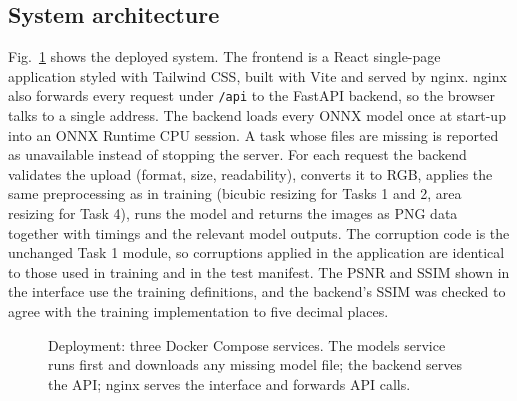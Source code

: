 \documentclass[conference]{IEEEtran}
\begin{document}
\subsection{System architecture}
Fig.~\ref{fig:sysarch} shows the deployed system. The frontend is a React single-page application styled with Tailwind CSS, built with Vite and served by nginx. nginx also forwards every request under \texttt{/api} to the FastAPI backend, so the browser talks to a single address. The backend loads every ONNX model once at start-up into an ONNX Runtime CPU session. A task whose files are missing is reported as unavailable instead of stopping the server. For each request the backend validates the upload (format, size, readability), converts it to RGB, applies the same preprocessing as in training (bicubic resizing for Tasks 1 and 2, area resizing for Task 4), runs the model and returns the images as PNG data together with timings and the relevant model outputs. The corruption code is the unchanged Task 1 module, so corruptions applied in the application are identical to those used in training and in the test manifest. The PSNR and SSIM shown in the interface use the training definitions, and the backend's SSIM was checked to agree with the training implementation to five decimal places.

\begin{figure}[t]
\centering
{}
\caption{Deployment: three Docker Compose services. The models service runs first and downloads any missing model file; the backend serves the API; nginx serves the interface and forwards API calls.}
\label{fig:sysarch}
\end{figure}
\end{document}
